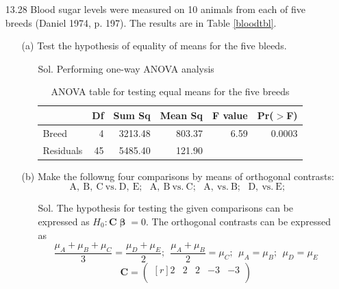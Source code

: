 \documentclass[12pt]{article} %
\begin{document}
\begin{enumerate}
\begin{itemize}
\begin{itemize}
\begin{table}[ht]
\begin{center}
\begin{tabular}{ccccc}
				\hline
				\end{tabular}
			\end{center}
			\end{table}						    
   		  \end{itemize}	    	   
	   \end{itemize}	   
   \item[13.28] Blood sugar levels were measured on 10 animals from each of five breeds (Daniel 1974, p. 197).
   The results are in Table \ref{bloodtbl}.
   	\begin{itemize}
	    \item[(a)] Test the hypothesis of equality of means for the five bleeds.
	      \begin{itemize}
		    \item[Sol.] Performing one-way ANOVA analysis
\begin{table}[ht]
\begin{center}
\begin{tabular}{lrrrrr}
  \hline
 & Df & Sum Sq & Mean Sq & F value & Pr($>$F) \\ 
  \hline
Breed & 4 & 3213.48 & 803.37 & 6.59 & 0.0003 \\ 
  Residuals & 45 & 5485.40 & 121.90 &  &  \\ 
   \hline
\end{tabular}
\caption{ANOVA table for testing equal means for the five breeds}
\end{center}
\end{table}   		  \end{itemize}	    	    
	    \item[(b)] Make the followng four comparisons by means of orthogonal contrasts:	    	    
	    \begin{equation*}
	    \mathrm{A,~B,~C~vs.~D,~E};~~~\mathrm{A,~B~vs.~C};~~~\mathrm{A,~vs.~B};~~~\mathrm{D,~vs.~E};
	    \end{equation*}
	      \begin{itemize}
		    \item[Sol.] The hypothesis for testing the given comparisons can be expressed as $H_{0}:\mathbf{C}
		    \pmb{\upbeta}=0$. The orthogonal contrasts can be expressed as 
		    $$
		    \frac{\mu_{A}+\mu_{B}+\mu_{C}}{3}=\frac{\mu_{D}+\mu_{E}}{2};~~\frac{\mu_{A}+\mu_{B}}{2}=\mu_{C};
		    ~~\mu_{A}=\mu_{B};~~\mu_{D}=\mu_{E}
		    $$
		    $$
		    \mathbf{C}=
		    \begin{pmatrix}[r] 
			    2 &   2 &   2  &  -3 &  -3 \\

\end{pmatrix}$$
\end{itemize}
\end{itemize}
\end{enumerate}
\end{document}

